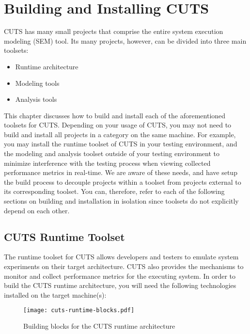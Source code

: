
\chapter{Building and Installing CUTS}
\label{chap:install}

CUTS has many small projects that comprise the entire system execution modeling
(SEM) tool. Its many projects, however, can be divided into three main toolsets:
\begin{itemize}
  \item Runtime architecture
  \item Modeling tools
  \item Analysis tools
\end{itemize}
This chapter discusses how to build and install each of the aforementioned
toolsets for CUTS. Depending on your usage of CUTS, you may not need to build 
and install all projects in a category on the same machine. For example, you 
may install the runtime toolset of CUTS in your testing environment, and 
the modeling and analysis toolset outside of your testing environment to 
minimize interference with the testing process when viewing collected 
performance metrics in real-time. We are aware of these needs, and have 
setup the build process to decouple projects within a toolset from projects 
external to its corresponding toolset. You can, therefore, refer to each of the 
following sections on building and installation in isolation since toolsets do 
not explicitly depend on each other.

\section{CUTS Runtime Toolset}
\label{sec:install-runtime}

The runtime toolset for CUTS allows developers and testers to emulate system 
experiments on their target architecture. CUTS also provides the mechanisms
to monitor and collect performance metrics for the executing system. In order to 
build the CUTS runtime architecture, you will need the following technologies 
installed on the target machine(s):
\begin{figure}[htbp]
  \centering
  \texttt{[image: cuts-runtime-blocks.pdf]}
  \caption{Building blocks for the CUTS runtime architecture}
  \label{fig:cuts-runtime-blocks}
\end{figure}

